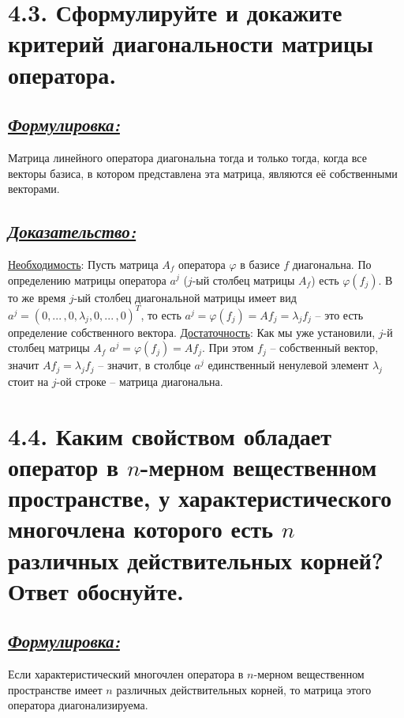 \documentclass{article}
\begin{document}
\section*{\LARGE 4.3. Сформулируйте и докажите критерий диагональности матрицы оператора.  }
\subsection*{\Large \underline{\textit{Формулировка: }}}
Матрица линейного оператора диагональна тогда и только тогда, когда все векторы базиса, в котором представлена эта матрица, являются её собственными векторами. 

\subsection*{\Large \underline{\textit{Доказательство: }}}
\underline{Необходимость}:
\newline Пусть матрица $A_f$ оператора $\varphi$ в базисе $f$ диагональна. По определению матрицы оператора $a^j$ ($j$-ый столбец матрицы $A_f$) есть $\varphi(f_j)$. В то же время $j$-ый столбец диагональной матрицы имеет вид $a^j = (0, ...\,, 0, \lambda_j, 0, ...\,, 0)^T$, то есть $a^j = \varphi(f_j) = \boxed{Af_j = \lambda_jf_j}$ -- это есть определение собственного вектора.
\newline \underline{Достаточность}:
\newline Как мы уже установили, $j$-й столбец матрицы $A_f$ $a^j = \varphi(f_j) = Af_j$. При этом $f_j$ -- собственный вектор, значит $Af_j = \lambda_jf_j$ -- значит, в столбце $a^j$ единственный ненулевой элемент $\lambda_j$ стоит на $j$-ой строке -- матрица диагональна.

\section*{\LARGE 4.4. Каким свойством обладает оператор в $n$-мерном вещественном пространстве, у характеристического многочлена которого есть $n$ различных действительных корней? Ответ обоснуйте.  }
\subsection*{\Large \underline{\textit{Формулировка: }}}
Если характеристический многочлен оператора в $n$-мерном вещественном пространстве имеет $n$ различных действительных корней, то матрица этого оператора диагонализируема.
\end{document}
